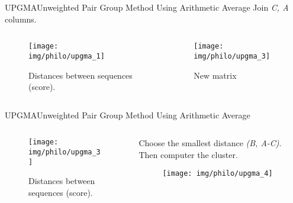 \documentclass[10pt]{beamer}
\newcommand{\1}{
	\setbeamertemplate{background}{
		\texttt{[image: img/1]}
		\tikz[overlay] \fill[fill opacity=0.75,fill=white] (0,0) rectangle (-\paperwidth,\paperheight);
	}
}
\begin{document}
\begin{frame}{UPGMA}{Unweighted Pair Group Method Using Arithmetic Average}
	Join \textit{C, A} columns. 
	\begin{columns}
		\begin{column}{0.48\textwidth}
			\begin{figure}
				\texttt{[image: img/philo/upgma\_1]}
				\caption{Distances between sequences (score).}
			\end{figure}
		\end{column}
		\begin{column}{0.48\textwidth}	
			\begin{figure}
				\texttt{[image: img/philo/upgma\_3]}
				\caption{New matrix}
			\end{figure}			
		\end{column}
	\end{columns}
	
\end{frame}

\begin{frame}{UPGMA}{Unweighted Pair Group Method Using Arithmetic Average}
	\begin{columns}
		\begin{column}{0.48\textwidth}
			\begin{figure}
				\texttt{[image: img/philo/upgma\_3]}
				\caption{Distances between sequences (score).}
			\end{figure}
		\end{column}
		\begin{column}{0.48\textwidth}
			
			Choose the smallest distance \textit{(B, A-C)}. Then computer the cluster.\\ 					
			
			\begin{figure}
				\texttt{[image: img/philo/upgma\_4]}
			\end{figure}
			
		\end{column}
	\end{columns}
	
\end{frame}
\end{document}
